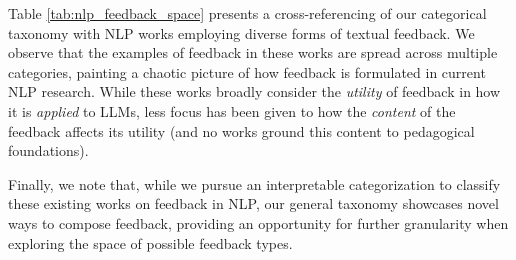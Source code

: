 Table \ref{tab:nlp_feedback_space} presents a cross-referencing of our categorical taxonomy with NLP works employing diverse forms of textual feedback. 
We observe that the examples of feedback in these works are spread across multiple categories, painting a chaotic picture of how feedback is formulated in current NLP research. While these works broadly consider the \textit{utility} of feedback in how it is \textit{applied} to LLMs, less focus has been given to how the \textit{content} of the feedback affects its utility (and no works ground this content to pedagogical foundations). 

Finally, we note that, while we pursue an interpretable categorization to classify these existing works on feedback in NLP, our general taxonomy showcases novel ways to compose feedback, providing an opportunity for further granularity when exploring the space of possible feedback types.



